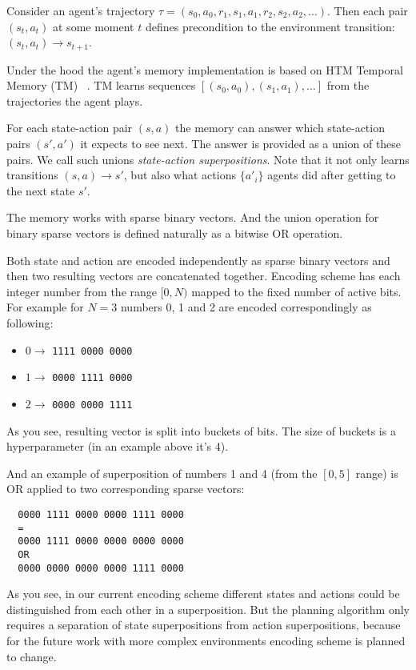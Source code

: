\documentclass[runningheads]{llncs}
\begin{document}
Consider an agent's trajectory $\tau = (s_0, a_0, r_1, s_1, a_1, r_2, s_2, a_2, ...)$. Then each pair $(s_t, a_t)$ at some moment $t$ defines precondition to the environment transition: $(s_t, a_t) \rightarrow s_{t+1}$.

Under the hood the agent's memory implementation is based on HTM Temporal Memory (TM) ~\cite{hawkins:TM}. TM learns sequences $[(s_0, a_0), (s_1, a_1), \dots]$ from the trajectories the agent plays.

For each state-action pair $(s, a)$ the memory can answer which state-action pairs $(s', a')$ it expects to see next. The answer is provided as a union of these pairs. We call such unions \textit{state-action superpositions}. Note that it not only learns transitions $(s, a) \rightarrow s'$, but also what actions $\{a'_i\}$ agents did after getting to the next state $s'$.

The memory works with sparse binary vectors. And the union operation for binary sparse vectors is defined naturally as a bitwise OR operation.

Both state and action are encoded independently as sparse binary vectors and then two resulting vectors are concatenated together. Encoding scheme has each integer number from the range $[0, N)$ mapped to the fixed number of active bits. For example for $N = 3$ numbers 0, 1 and 2 are encoded correspondingly as following:

\begin{itemize}
  \item $0 \rightarrow$ \verb|1111 0000 0000|
  \item $1 \rightarrow$ \verb|0000 1111 0000|
  \item $2 \rightarrow$ \verb|0000 0000 1111|
\end{itemize}

As you see, resulting vector is split into buckets of bits. The size of buckets is a hyperparameter (in an example above it's 4).

And an example of superposition of numbers 1 and 4 (from the $[0, 5]$ range) is OR applied to two corresponding sparse vectors:

\begin{verbatim}
  0000 1111 0000 0000 1111 0000
  =
  0000 1111 0000 0000 0000 0000
  OR
  0000 0000 0000 0000 1111 0000
\end{verbatim}

As you see, in our current encoding scheme different states and actions could be distinguished from each other in a superposition. But the planning algorithm only requires a separation of state superpositions from action superpositions, because for the future work with more complex environments encoding scheme is planned to change.
\end{document}

